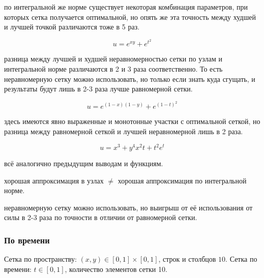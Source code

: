 \conclusion по интегральной же норме существует некоторая комбинация параметров, при которых сетка получается оптимальной, но опять же эта точность между худшей и лучшей точкой различаются тоже в 5 раз.

$$ u = e^{xy} + e^{t^2} $$


\conclusion разница между лучшей и худшей неравномерностью сетки по узлам и интегральной норме различаются в 2 и 3 раза соответственно. То есть неравномерную сетку можно использовать, но только если знать куда сгущать, и результаты будут лишь в 2-3 раза лучше равномерной сетки.

$$ u = e^{(1-x)(1-y)} + e^{(1-t)^2} $$


\conclusion здесь имеются явно выраженные и монотонные участки с оптимальной сеткой, но разница между равномерной сеткой и лучшей неравномерной лишь в 2 раза.

$$ u = x^3 + y^4 x^2 t + t^2 e^t $$


\conclusion всё аналогично предыдущим выводам и функциям.


\conclusion хорошая аппроксимация в узлах $\neq$ хорошая аппроксимация по интегральной норме.

\conclusion неравномерную сетку можно использовать, но выигрыш от её использования от силы в 2-3 раза по точности в отличии от равномерной сетки.

\subsubsection{По времени}

Сетка по пространству: $ (x, y) \in [0, 1] \times [0, 1] $, строк и столбцов $10$. Сетка по времени: $ t \in [0, 1] $, количество элементов сетки 10.

\newcommand{\includetwographs}[1]{
\noindent\begin{tikzpicture}
\begin{semilogyaxis}[xlabel=t,ylabel=Интегральная разность,width=0.49\textwidth, height=6cm]
\addplot[black, dashed, no markers] table [y=integral, x=t]{#1.txt};
\addplot[black, no markers] table [y=uniform_integral, x=t]{#1.txt};
\legend{Неравномерная сетка,Равномерная сетка}
\end{semilogyaxis}
\end{tikzpicture}
\begin{tikzpicture}
\begin{semilogyaxis}[xlabel=t,ylabel=Норма разности векторов,width=0.49\textwidth, height=6cm]
\addplot[black, dashed, no markers] table [y=norm, x=t]{#1.txt};
\addplot[black, no markers] table [y=uniform_norm, x=t]{#1.txt};
\legend{Неравномерная сетка,Равномерная сетка}
\end{semilogyaxis}
\end{tikzpicture}
}

